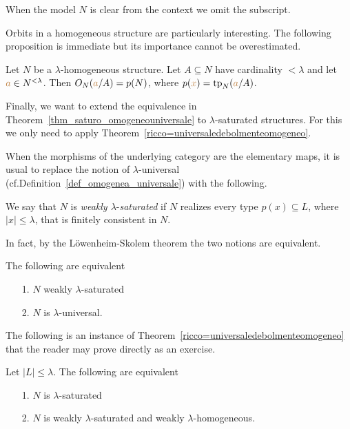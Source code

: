 
When the model $N$ is clear from the context we omit the subscript.

Orbits in a homogeneous structure are particularly interesting. The following proposition is immediate but its importance cannot be overestimated.

\begin{proposition}\label{omogeneitaorbitetipi}
Let $N$ be a $\lambda\mbox{-}$homogeneous structure. Let $A\subseteq N$ have cardinality $<\lambda$ and let ${\color{brown} a}\in N^{<\lambda}$. Then $O_N({\color{brown} a}/A)=p(N)$, where $p({\color{brown} x})={\rm tp}_N({\color{brown} a}/A)$.
\end{proposition}


Finally, we want to extend the equivalence in Theorem~\ref{thm_saturo_omogeneouniversale} to $\lambda\mbox{-}$saturated structures. For this we only need to apply Theorem~\ref{ricco=universaledebolmenteomogeneo}. 

When the morphisms of the underlying category are the elementary maps, it is usual to replace the notion of $\lambda\mbox{-}$universal (cf.\@ Definition~\ref{def_omogenea_universale}) with the following.

\begin{definition}\label{def_w_saturation}
  We say that $N$ is \emph{weakly $\lambda\mbox{-}$saturated\/} if $N$ realizes every type $p(x)\subseteq L$, where $|x|\le\lambda$, that is finitely consistent in $N$.
\end{definition}

In fact, by the L\"owenheim-Skolem theorem the two notions are equivalent.

\begin{proposition}\label{prop_w_saturation}
The following are equivalent
\begin{itemize}
\item[1.] $N$ weakly $\lambda\mbox{-}$saturated
\item[2.] $N$ is $\lambda$-universal.
\end{itemize}
\end{proposition}

The following is an instance of Theorem~\ref{ricco=universaledebolmenteomogeneo} that the reader may prove directly as an exercise.

\begin{corollary}\label{saturo=universaledebolmenteomogeneo}
Let $|L|\le\lambda$. The following are equivalent\nobreak
\begin{itemize}
\item[1.] $N$ is $\lambda\mbox{-}$saturated
\item[2.] $N$ is weakly $\lambda\mbox{-}$saturated and weakly $\lambda\mbox{-}$homogeneous.
\end{itemize}
\end{corollary}

